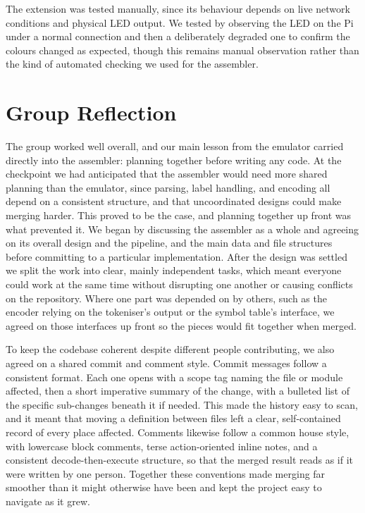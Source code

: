 \documentclass[11pt]{article}
\begin{document}
The extension was tested manually, since its behaviour depends on live network conditions and physical LED output. We tested by observing the LED on the Pi under a normal connection and then a deliberately degraded one to confirm the colours changed as expected, though this remains manual observation rather than the kind of automated checking we used for the assembler.

\section{Group Reflection}

The group worked well overall, and our main lesson from the emulator carried directly into the assembler: planning together before writing any code. At the checkpoint we had anticipated that the assembler would need more shared planning than the emulator, since parsing, label handling, and encoding all depend on a consistent structure, and that uncoordinated designs could make merging harder. This proved to be the case, and planning together up front was what prevented it. We began by discussing the assembler as a whole and agreeing on its overall design and the pipeline, and the main data and file structures before committing to a particular implementation. After the design was settled we split the work into clear, mainly independent tasks, which meant everyone could work at the same time without disrupting one another or causing conflicts on the repository. Where one part was depended on by others, such as the encoder relying on the tokeniser's output or the symbol table's interface, we agreed on those interfaces up front so the pieces would fit together when merged.

To keep the codebase coherent despite different people contributing, we also agreed on a shared commit and comment style. Commit messages follow a consistent format. Each one opens with a scope tag naming the file or module affected, then a short imperative summary of the change, with a bulleted list of the specific sub-changes beneath it if needed. This made the history easy to scan, and it meant that moving a definition between files left a clear, self-contained record of every place affected. Comments likewise follow a common house style, with lowercase block comments, terse action-oriented inline notes, and a consistent decode-then-execute structure, so that the merged result reads as if it were written by one person. Together these conventions made merging far smoother than it might otherwise have been and kept the project easy to navigate as it grew.
\end{document}
